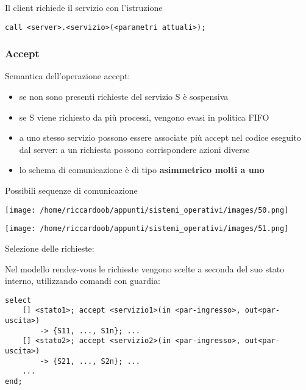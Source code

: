 Il client richiede il servizio con l'istruzione
\begin{verbatim}
call <server>.<servizio>(<parametri attuali>);
\end{verbatim}

\subsubsection{Accept}
Semantica dell'operazione accept:
\begin{itemize}
    \item se non sono presenti richieste del servizio S è sospensiva
    \item se S viene richiesto da più processi, vengono evasi in politica FIFO
    \item a uno stesso servizio possono essere associate più accept nel codice eseguito dal server: a un richiesta possono corrispondere azioni diverse
    \item lo schema di comunicazione è di tipo \textbf{asimmetrico molti a uno}
\end{itemize}

Possibili sequenze di comunicazione
\begin{multicols}{2}
\begin{multicolfigure}
    \centering
    \texttt{[image: /home/riccardoob/appunti/sistemi\_operativi/images/50.png]}
\end{multicolfigure}
\columnbreak
\begin{multicolfigure}
    \centering
    \texttt{[image: /home/riccardoob/appunti/sistemi\_operativi/images/51.png]}
\end{multicolfigure}
    
\end{multicols}

\noindent
Selezione delle richieste:

Nel modello rendez-vous le richieste vengono scelte a seconda del suo stato interno, utilizzando comandi con guardia:
\begin{verbatim}
select
    [] <stato1>; accept <servizio1>(in <par-ingresso>, out<par-uscita>)
        -> {S11, ..., S1n}; ...
    [] <stato2>; accept <servizio2>(in <par-ingresso>, out<par-uscita>)
        -> {S21, ..., S2n}; ...
    ...
end;
\end{verbatim}

